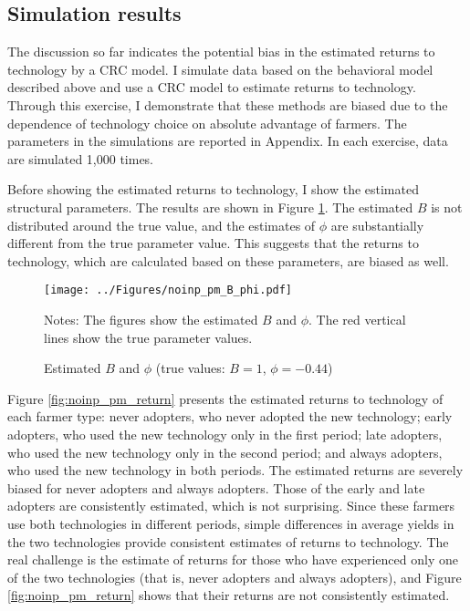\documentclass[11pt,letterpaper]{article}
\begin{document}
\subsection{Simulation results}\label{sec:sim_1}

The discussion so far indicates the potential bias in the estimated returns to technology by a CRC model.
I simulate data based on the behavioral model described above and use a CRC model to estimate returns to technology.
Through this exercise, I demonstrate that these methods are biased due to the dependence of technology choice on absolute advantage of farmers.
The parameters in the simulations are reported in Appendix.
In each exercise, data are simulated 1,000 times.

Before showing the estimated returns to technology, I show the estimated structural parameters.
The results are shown in Figure \ref{fig:noinp_pm_B_phi}.
The estimated $B$ is not distributed around the true value, and the estimates of $\phi$ are substantially different from the true parameter value.
This suggests that the returns to technology, which are calculated based on these parameters, are biased as well.

\begin{figure}[H]
  \centering
  \caption{Estimated $B$ and $\phi$ (true values: $B = 1$, $\phi = -0.44$)}
  \texttt{[image: ../Figures/noinp\_pm\_B\_phi.pdf]}
  \label{fig:noinp_pm_B_phi}
  \footnotesize
  \begin{tablenotes}
    \item Notes:
      The figures show the estimated $B$ and $\phi$.
      The red vertical lines show the true parameter values.
  \end{tablenotes}
\end{figure}

Figure \ref{fig:noinp_pm_return} presents the estimated returns to technology of each farmer type: 
never adopters, who never adopted the new technology;
early adopters, who used the new technology only in the first period;
late adopters, who used the new technology only in the second period; and
always adopters, who used the new technology in both periods.
The estimated returns are severely biased for never adopters and always adopters.
Those of the early and late adopters are consistently estimated, which is not surprising.
Since these farmers use both technologies in different periods, simple differences in average yields in the two technologies provide consistent estimates of returns to technology.
The real challenge is the estimate of returns for those who have experienced only one of the two technologies (that is, never adopters and always adopters), and Figure \ref{fig:noinp_pm_return} shows that their returns are not consistently estimated.
\end{document}
